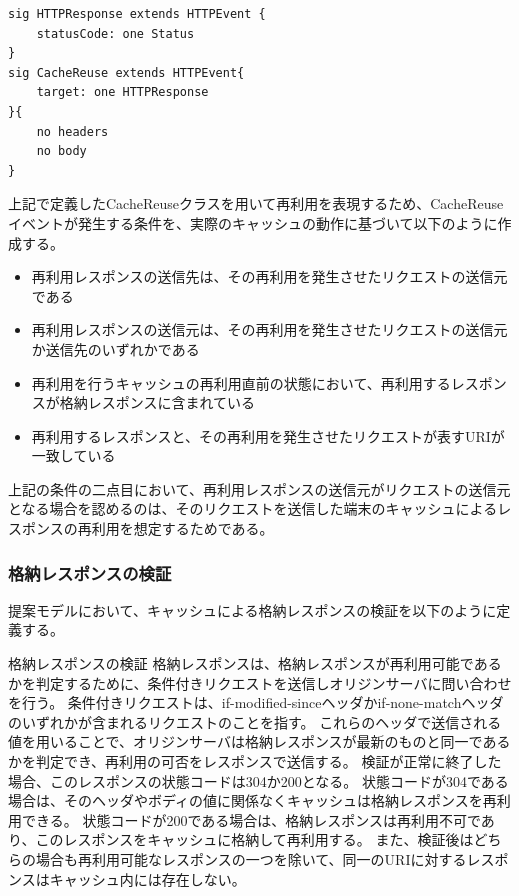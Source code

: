 \documentclass[journal]{IEEEtran}
\begin{document}
\begin{lstlisting}[caption=CacheReuseクラス, label=code:CacheReuseClass]
sig HTTPResponse extends HTTPEvent {
	statusCode: one Status
}
sig CacheReuse extends HTTPEvent{
	target: one HTTPResponse
}{
	no headers
	no body
}
\end{lstlisting}

上記で定義したCacheReuseクラスを用いて再利用を表現するため、CacheReuseイベントが発生する条件を、実際のキャッシュの動作に基づいて以下のように作成する。
\begin{itemize}
\item 再利用レスポンスの送信先は、その再利用を発生させたリクエストの送信元である
\item 再利用レスポンスの送信元は、その再利用を発生させたリクエストの送信元か送信先のいずれかである
\item 再利用を行うキャッシュの再利用直前の状態において、再利用するレスポンスが格納レスポンスに含まれている
\item 再利用するレスポンスと、その再利用を発生させたリクエストが表すURIが一致している
\end{itemize}

上記の条件の二点目において、再利用レスポンスの送信元がリクエストの送信元となる場合を認めるのは、そのリクエストを送信した端末のキャッシュによるレスポンスの再利用を想定するためである。

\subsubsection{格納レスポンスの検証}
\label{sec:CacheVerification}
提案モデルにおいて、キャッシュによる格納レスポンスの検証を以下のように定義する。

\begin{itembox}[l]{格納レスポンスの検証}
格納レスポンスは、格納レスポンスが再利用可能であるかを判定するために、条件付きリクエストを送信しオリジンサーバに問い合わせを行う。
条件付きリクエストは、if-modified-sinceヘッダかif-none-matchヘッダのいずれかが含まれるリクエストのことを指す。
これらのヘッダで送信される値を用いることで、オリジンサーバは格納レスポンスが最新のものと同一であるかを判定でき、再利用の可否をレスポンスで送信する。
検証が正常に終了した場合、このレスポンスの状態コードは304か200となる。
状態コードが304である場合は、そのヘッダやボディの値に関係なくキャッシュは格納レスポンスを再利用できる。
状態コードが200である場合は、格納レスポンスは再利用不可であり、このレスポンスをキャッシュに格納して再利用する。
また、検証後はどちらの場合も再利用可能なレスポンスの一つを除いて、同一のURIに対するレスポンスはキャッシュ内には存在しない。
\end{itembox}
\end{document}
